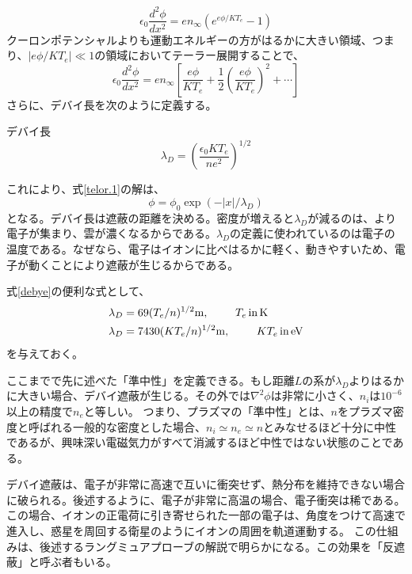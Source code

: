 \documentclass{ltjsarticle}
\numberwithin{equation}{section} %
\begin{document}
\[
\epsilon_0 \frac{d^2\phi}{dx^2}= en_\infty(e^{e\phi/KT_e} - 1)
\]
クーロンポテンシャルよりも運動エネルギーの方がはるかに大きい領域、つまり、$|e\phi / KT_e| \ll 1$の領域においてテーラー展開することで、
\[
 \epsilon_0 \frac{d^2\phi}{dx^2} = en_\infty\left[\frac{e\phi}{KT_e}+ \frac{1}{2}(\frac{e\phi}{KT_e})^2 + \cdots \right] \label{telor.1}
\]
さらに、デバイ長を次のように定義する。
\begin{eqbox}{デバイ長}
\begin{equation}
 \lambda_D = \left(\dfrac{\epsilon_0 KT_e}{ne^2}\right)^{1/2} \label{debye}
\end{equation}
\end{eqbox}
これにより、式\eqref{telor.1}の解は、
\begin{equation}
  \phi = \phi_0 \exp(-|x|/\lambda_D) \label{debye.poten}
\end{equation}
となる。デバイ長は遮蔽の距離を決める。密度が増えると$\lambda_D$が減るのは、より電子が集まり、雲が濃くなるからである。$\lambda_D$の定義に使われているのは電子の温度である。なぜなら、電子はイオンに比べはるかに軽く、動きやすいため、電子が動くことにより遮蔽が生じるからである。

式\eqref{debye}の便利な式として、
\begin{align}
  \begin{split}
    \lambda_D &= 69(T_e/n)^{1/2}\si{\metre}, \hspace{2pc}  T_e\, \text{in} \, \si{\kelvin}\\
    \lambda_D &= 7430(KT_e/n)^{1/2}\si{\metre}, \hspace{2pc} KT_e\, \text{in} \, \si{\electronvolt}
  \end{split}
\end{align}
を与えておく。

ここまでで先に述べた「準中性」を定義できる。もし距離$L$の系が$\lambda_D$よりはるかに大きい場合、デバイ遮蔽が生じる。その外では$\nabla^2 \phi$は非常に小さく、$n_i$は$10^{-6}$以上の精度で$n_e$と等しい。
つまり、プラズマの「準中性」とは、$n$をプラズマ密度と呼ばれる一般的な密度とした場合、$n_i \simeq n_e \simeq n$とみなせるほど十分に中性であるが、興味深い電磁気力がすべて消滅するほど中性ではない状態のことである。 

デバイ遮蔽は、電子が非常に高速で互いに衝突せず、熱分布を維持できない場合に破られる。後述するように、電子が非常に高温の場合、電子衝突は稀である。この場合、イオンの正電荷に引き寄せられた一部の電子は、角度をつけて高速で進入し、惑星を周回する衛星のようにイオンの周囲を軌道運動する。
この仕組みは、後述するラングミュアプローブの解説で明らかになる。この効果を「反遮蔽」と呼ぶ者もいる。
\end{document}

